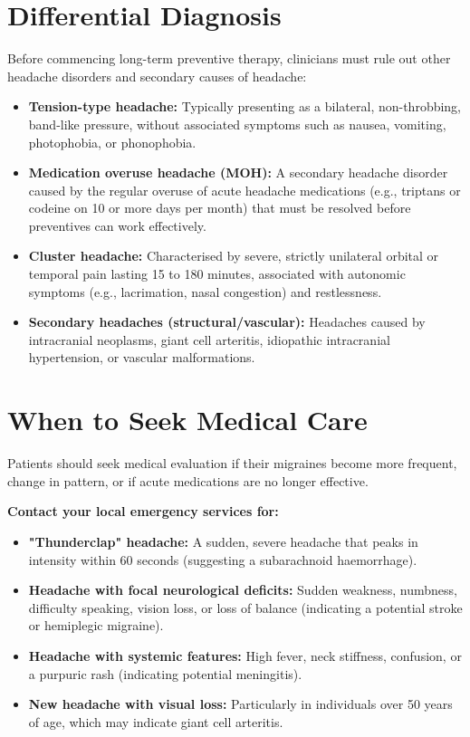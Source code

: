 \section*{Differential Diagnosis}
Before commencing long-term preventive therapy, clinicians must rule out other headache disorders and secondary causes of headache:
\begin{itemize}
    \item \textbf{Tension-type headache:} Typically presenting as a bilateral, non-throbbing, band-like pressure, without associated symptoms such as nausea, vomiting, photophobia, or phonophobia.
    \item \textbf{Medication overuse headache (MOH):} A secondary headache disorder caused by the regular overuse of acute headache medications (e.g., triptans or codeine on 10 or more days per month) that must be resolved before preventives can work effectively.
    \item \textbf{Cluster headache:} Characterised by severe, strictly unilateral orbital or temporal pain lasting 15 to 180 minutes, associated with autonomic symptoms (e.g., lacrimation, nasal congestion) and restlessness.
    \item \textbf{Secondary headaches (structural/vascular):} Headaches caused by intracranial neoplasms, giant cell arteritis, idiopathic intracranial hypertension, or vascular malformations.
\end{itemize}

\section*{When to Seek Medical Care}
Patients should seek medical evaluation if their migraines become more frequent, change in pattern, or if acute medications are no longer effective.

\textbf{Contact your local emergency services for:}
\begin{itemize}
    \item \textbf{"Thunderclap" headache:} A sudden, severe headache that peaks in intensity within 60 seconds (suggesting a subarachnoid haemorrhage).
    \item \textbf{Headache with focal neurological deficits:} Sudden weakness, numbness, difficulty speaking, vision loss, or loss of balance (indicating a potential stroke or hemiplegic migraine).
    \item \textbf{Headache with systemic features:} High fever, neck stiffness, confusion, or a purpuric rash (indicating potential meningitis).
    \item \textbf{New headache with visual loss:} Particularly in individuals over 50 years of age, which may indicate giant cell arteritis.
\end{itemize}

